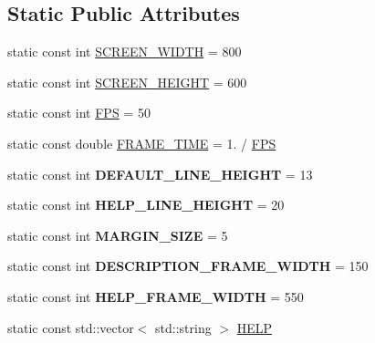 \subsection*{Static Public Attributes}
\begin{DoxyCompactItemize}
\item 
static const int \hyperlink{class_view_a49d4babbeaa66af838d11cb5139becca}{S\+C\+R\+E\+E\+N\+\_\+\+W\+I\+D\+T\+H} = 800
\item 
static const int \hyperlink{class_view_a27d60d1f32f4f86745aedd73eecaaece}{S\+C\+R\+E\+E\+N\+\_\+\+H\+E\+I\+G\+H\+T} = 600
\item 
static const int \hyperlink{class_view_ac4811bd9d7b2887fb16bbc182338f2ce}{F\+P\+S} = 50
\item 
static const double \hyperlink{class_view_ae3addf8d83b08604be5ccfb8e5736c81}{F\+R\+A\+M\+E\+\_\+\+T\+I\+M\+E} = 1. / \hyperlink{class_view_ac4811bd9d7b2887fb16bbc182338f2ce}{F\+P\+S}
\item 
\hypertarget{class_view_a752b0a4ac38773dddc9af98f61aa3de2}{}static const int {\bfseries D\+E\+F\+A\+U\+L\+T\+\_\+\+L\+I\+N\+E\+\_\+\+H\+E\+I\+G\+H\+T} = 13\label{class_view_a752b0a4ac38773dddc9af98f61aa3de2}

\item 
\hypertarget{class_view_a0084e22c5044008fc68cabf2772beda0}{}static const int {\bfseries H\+E\+L\+P\+\_\+\+L\+I\+N\+E\+\_\+\+H\+E\+I\+G\+H\+T} = 20\label{class_view_a0084e22c5044008fc68cabf2772beda0}

\item 
\hypertarget{class_view_a6f2e83ffc043c7dfe1795c799b3107e5}{}static const int {\bfseries M\+A\+R\+G\+I\+N\+\_\+\+S\+I\+Z\+E} = 5\label{class_view_a6f2e83ffc043c7dfe1795c799b3107e5}

\item 
\hypertarget{class_view_a78aa6c5d5bbc6ca97e378a5043c445b5}{}static const int {\bfseries D\+E\+S\+C\+R\+I\+P\+T\+I\+O\+N\+\_\+\+F\+R\+A\+M\+E\+\_\+\+W\+I\+D\+T\+H} = 150\label{class_view_a78aa6c5d5bbc6ca97e378a5043c445b5}

\item 
\hypertarget{class_view_a20c05e0b8bff716d8219daf89264fe25}{}static const int {\bfseries H\+E\+L\+P\+\_\+\+F\+R\+A\+M\+E\+\_\+\+W\+I\+D\+T\+H} = 550\label{class_view_a20c05e0b8bff716d8219daf89264fe25}

\item 
static const std\+::vector$<$ std\+::string $>$ \hyperlink{class_view_ad5ede1942eee21c13e7bfeda1c6d9801}{H\+E\+L\+P}
\end{DoxyCompactItemize}


